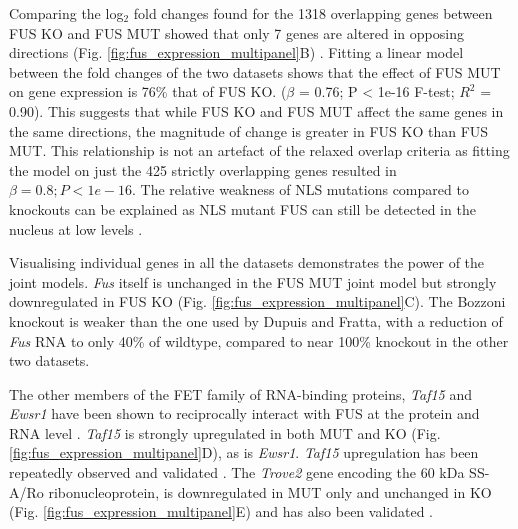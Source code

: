 Comparing the log$_2$ fold changes found for the 1318 overlapping genes between FUS KO and FUS MUT showed that only 7 genes are altered in opposing directions (Fig. \ref{fig:fus_expression_multipanel}B) .
Fitting a linear model between the fold changes of the two datasets shows that the effect of FUS MUT on gene expression is 76\% that of FUS KO.  ($\beta$ = 0.76; P < 1e-16 F-test; $R^2$ = 0.90).
This suggests that while FUS KO and FUS MUT affect the same genes in the same directions, the magnitude of change is greater in FUS KO than FUS MUT. 
This relationship is not an artefact of the relaxed overlap criteria as fitting the model on just the 425 strictly overlapping genes resulted in $\beta = 0.8; P < 1e-16$. %
The relative weakness of NLS mutations compared to knockouts can be explained as NLS mutant FUS can still be detected in the nucleus at low levels \citep{Devoy2017, Scekic-zahirovic2016}.

Visualising individual genes in all the datasets demonstrates the power of the joint models.
\textit{Fus} itself is unchanged in the FUS MUT joint model  but strongly downregulated in FUS KO (Fig. \ref{fig:fus_expression_multipanel}C).
The Bozzoni knockout  is weaker than the one used by Dupuis and Fratta, with a reduction of \textit{Fus} RNA to only 40\% of wildtype, compared to near 100\% knockout in the other two datasets.

The other members of the FET family of RNA-binding proteins,  \textit{Taf15} and \textit{Ewsr1} have been shown to reciprocally interact with FUS at the protein and RNA level \citep{Kapeli2016,Lagier-Tourenne2012}.
\textit{Taf15} is strongly upregulated in both MUT and KO (Fig. \ref{fig:fus_expression_multipanel}D), as is \textit{Ewsr1}.  \textit{Taf15} upregulation has been repeatedly observed and validated \citep{Kino2015, Scekic-zahirovic2016}. %
The \textit{Trove2} gene encoding the 60 kDa SS-A/Ro ribonucleoprotein,  is downregulated in MUT only and unchanged in KO (Fig. \ref{fig:fus_expression_multipanel}E) and has also been validated \citep{Scekic-zahirovic2016}.


